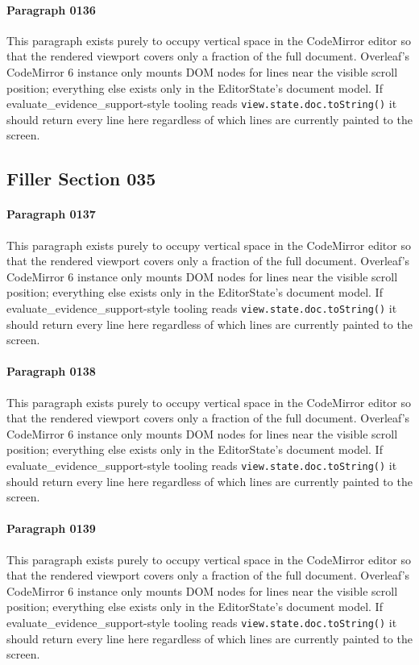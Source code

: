 \documentclass{article}
\begin{document}
\paragraph{Paragraph 0136}
This paragraph exists purely to occupy vertical space in the CodeMirror editor so that the rendered viewport covers only a fraction of the full document. Overleaf's CodeMirror 6 instance only mounts DOM nodes for lines near the visible scroll position; everything else exists only in the EditorState's document model. If evaluate\_evidence\_support-style tooling reads \texttt{view.state.doc.toString()} it should return every line here regardless of which lines are currently painted to the screen.

\subsection{Filler Section 035}
\paragraph{Paragraph 0137}
This paragraph exists purely to occupy vertical space in the CodeMirror editor so that the rendered viewport covers only a fraction of the full document. Overleaf's CodeMirror 6 instance only mounts DOM nodes for lines near the visible scroll position; everything else exists only in the EditorState's document model. If evaluate\_evidence\_support-style tooling reads \texttt{view.state.doc.toString()} it should return every line here regardless of which lines are currently painted to the screen.

\paragraph{Paragraph 0138}
This paragraph exists purely to occupy vertical space in the CodeMirror editor so that the rendered viewport covers only a fraction of the full document. Overleaf's CodeMirror 6 instance only mounts DOM nodes for lines near the visible scroll position; everything else exists only in the EditorState's document model. If evaluate\_evidence\_support-style tooling reads \texttt{view.state.doc.toString()} it should return every line here regardless of which lines are currently painted to the screen.

\paragraph{Paragraph 0139}
This paragraph exists purely to occupy vertical space in the CodeMirror editor so that the rendered viewport covers only a fraction of the full document. Overleaf's CodeMirror 6 instance only mounts DOM nodes for lines near the visible scroll position; everything else exists only in the EditorState's document model. If evaluate\_evidence\_support-style tooling reads \texttt{view.state.doc.toString()} it should return every line here regardless of which lines are currently painted to the screen.
\end{document}
